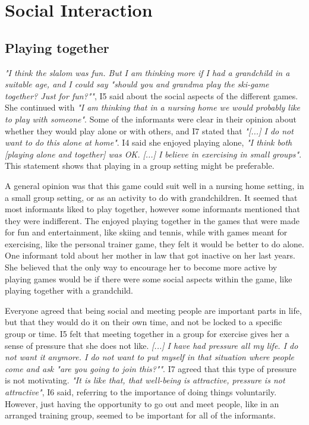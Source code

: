 \section{Social Interaction}
\subsection{Playing together}
\emph{"I think the slalom was fun. But I am thinking more if I had a grandchild in a suitable age, and I could say "should you and grandma play the ski-game together? Just for fun?""}, I5 said about the social aspects of the different games. She continued with \emph{"I am thinking that in a nursing home we would probably like to play with someone"}. Some of the informants were clear in their opinion about whether they would play alone or with others, and I7 stated that \emph{"[...] I do not want to do this alone at home"}. I4 said she  enjoyed playing alone, \emph{"I think both [playing alone and together] was OK. [...] I believe in  exercising in small groups"}. This statement shows that playing in a group setting might be preferable.  

A general opinion was that this game could suit well in a nursing home setting, in a small group setting, or as an activity to do with grandchildren. It seemed that most informants liked to play together, however some informants mentioned that they were indifferent. The enjoyed playing together in the games that were made for fun and entertainment, like skiing and tennis, while with games meant for exercising, like the personal trainer game, they felt it would be better to do alone. One informant told about her mother in law that got inactive on her last years. She believed that the only way to encourage her to become more active by playing games would be if there were some social aspects within the game, like playing together with a grandchild. 

Everyone agreed that being social and meeting people are important parts in life, but that they would do it on their own time, and not be locked to a specific group or time. I5 felt that meeting together in a group for exercise gives her a sense of pressure that she does not like. \emph{[...] I have had pressure all my life. I do not want it anymore. I do not want to put myself in that situation where people come and ask "are you going to join this?""}. I7 agreed that this type of pressure is not motivating. \emph{"It is like that, that well-being is attractive, pressure is not attractive"}, I6 said, referring to the importance of doing things voluntarily. However, just having the opportunity to go out and meet people, like in an arranged training group, seemed to be important for all of the informants. 

